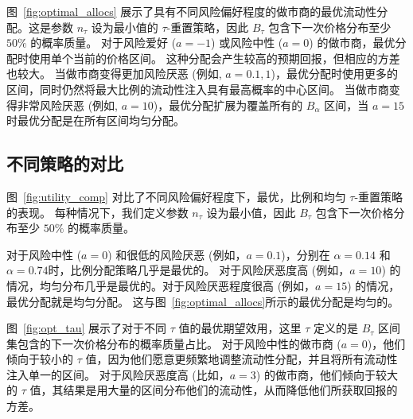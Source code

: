\documentclass[sigconf, dvipsnames]{acmart}
\begin{document}
\quad 图~\ref{fig:optimal_allocs} 展示了具有不同风险偏好程度的做市商的最优流动性分配。这是参数 $n_{\tau}$ 设为最小值的 $\tau$-重置策略，因此 $B_\tau$ 包含下一次价格分布至少 $50\%$ 的概率质量。
对于风险爱好 ($a=-1$) 或风险中性 ($a=0$) 的做市商，最优分配时使用单个当前的价格区间。
这种分配会产生较高的预期回报，但相应的方差也较大。
当做市商变得更加风险厌恶 (例如, $a=0.1,1$)，最优分配时使用更多的区间，同时仍然将最大比例的流动性注入具有最高概率的中心区间。
当做市商变得非常风险厌恶 (例如, $a=10$)，最优分配扩展为覆盖所有的 $B_{\alpha}$ 区间，当 $a=15$ 时最优分配是在所有区间均匀分配。



\subsection{不同策略的对比}



\quad 图~\ref{fig:utility_comp} 对比了不同风险偏好程度下，最优，比例和均匀 $\tau$-重置策略的表现。
每种情况下，我们定义参数 $n_{\tau}$ 设为最小值，因此 $B_\tau$ 包含下一次价格分布至少 $50\%$ 的概率质量。

对于风险中性 ($a=0$) 和很低的风险厌恶 (例如，$a=0.1$)，分别在 $\alpha=0.14$ 和 $\alpha=0.74$时，比例分配策略几乎是最优的。
对于风险厌恶度高 (例如，$a=10$) 的情况，均匀分布几乎是最优的。对于风险厌恶程度很高 (例如，$a=15$) 的情况，最优分配就是均匀分配。
这与图~\ref{fig:optimal_allocs}所示的最优分配是均匀的。

图~\ref{fig:opt_tau} 展示了对于不同 $\tau$ 值的最优期望效用，这里 $\tau$ 定义的是 $B_{\tau}$ 区间集包含的下一次价格分布的概率质量占比。
对于风险中性的做市商 ($a=0$)，他们倾向于较小的 $\tau$ 值，因为他们愿意更频繁地调整流动性分配，并且将所有流动性注入单一的区间。
对于风险厌恶度高 (比如，$a=3$) 的做市商，他们倾向于较大的 $\tau$ 值，其结果是用大量的区间分布他们的流动性，从而降低他们所获取回报的方差。
\end{document}
